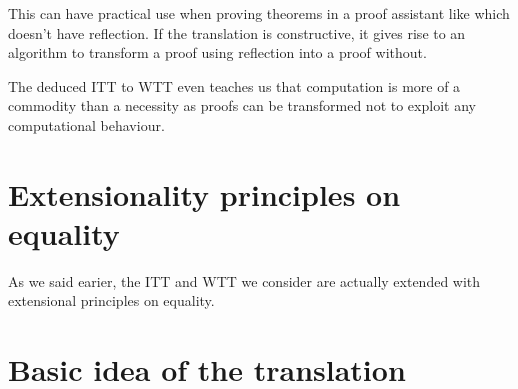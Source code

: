 This can have practical use when proving theorems in a proof assistant like \Coq
which doesn't have reflection. If the translation is constructive, it gives
rise to an algorithm to transform a proof using reflection into a proof without.

The deduced \acrshort{ITT} to \acrshort{WTT} even teaches us that computation
is more of a commodity than a necessity as proofs can be transformed not to
exploit any computational behaviour.

\section{Extensionality principles on equality}

As we said earier, the \acrshort{ITT} and \acrshort{WTT} we consider are
actually extended with extensional principles on equality.

\section{Basic idea of the translation}

